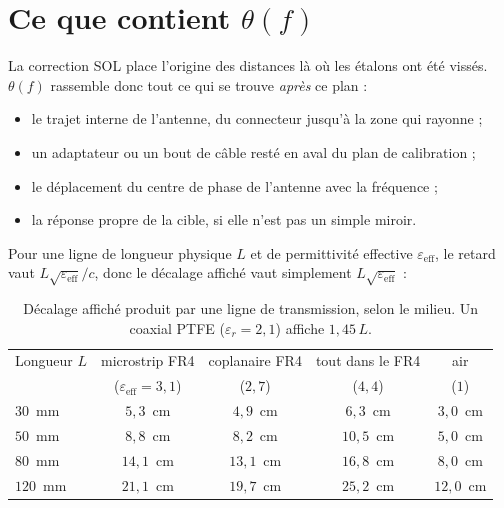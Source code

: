 \documentclass[11pt,a4paper]{article}
\begin{document}
\section{Ce que contient $\theta(f)$}

La correction SOL place l'origine des distances là où les étalons ont été
vissés. $\theta(f)$ rassemble donc tout ce qui se trouve \emph{après} ce plan :

\begin{itemize}
\item le trajet interne de l'antenne, du connecteur jusqu'à la zone qui
      rayonne ;
\item un adaptateur ou un bout de câble resté en aval du plan de calibration ;
\item le déplacement du centre de phase de l'antenne avec la fréquence ;
\item la réponse propre de la cible, si elle n'est pas un simple miroir.
\end{itemize}

Pour une ligne de longueur physique $L$ et de permittivité effective
$\varepsilon_{\text{eff}}$, le retard vaut $L\sqrt{\varepsilon_{\text{eff}}}/c$,
donc le décalage affiché vaut simplement $L\sqrt{\varepsilon_{\text{eff}}}$ :

\begin{table}[H]
\centering
\begin{tabular}{lcccc}
\toprule
Longueur $L$ & microstrip FR4 & coplanaire FR4 & tout dans le FR4 & air \\
 & ($\varepsilon_{\text{eff}} = 3{,}1$) & ($2{,}7$) & ($4{,}4$) & ($1$) \\
\midrule
$30$~mm  & $5{,}3$~cm & $4{,}9$~cm & $6{,}3$~cm & $3{,}0$~cm \\
$50$~mm  & $8{,}8$~cm & $8{,}2$~cm & $10{,}5$~cm & $5{,}0$~cm \\
$80$~mm  & $14{,}1$~cm & $13{,}1$~cm & $16{,}8$~cm & $8{,}0$~cm \\
$120$~mm & $21{,}1$~cm & $19{,}7$~cm & $25{,}2$~cm & $12{,}0$~cm \\
\bottomrule
\end{tabular}
\caption{Décalage affiché produit par une ligne de transmission, selon le
milieu. Un coaxial PTFE ($\varepsilon_r = 2{,}1$) affiche $1{,}45\,L$.}
\label{tab:lignes}
\end{table}
\end{document}
